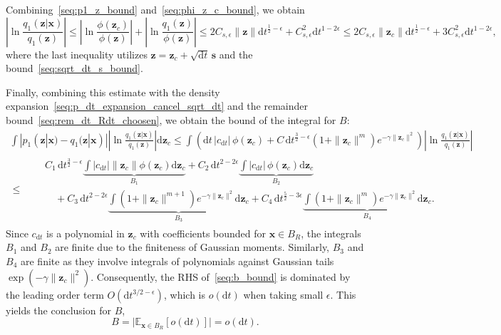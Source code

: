\documentclass[
 longbibliography,
 twocolumn,
 superscriptaddress,
 amsmath,
 amssymb,
 amsthm,
 amsfonts,
 prl,
 floatfix,
]{revtex4-2}
\begin{document}
\begin{widetext}
Combining~\eqref{seq:p1_z_bound} and~\eqref{seq:phi_z_c_bound}, we obtain
\begin{equation}
    \left|\ln\frac{q_1(\bm z|\bm x)}{q_1(\bm z)}\right|
    \leq
    \left|\ln\frac{\phi(\bm z_c)}{\phi(\bm z)}\right|
    +\left|\ln\frac{q_1(\bm z)}{\phi(\bm z)}\right|
    \leq
    2C_{s,\epsilon}\|\bm z\|\mathrm dt^{\frac{1}{2}-\epsilon}
    +C_{s,\epsilon}^2\mathrm dt^{1-2\epsilon}
    \leq2C_{s,\epsilon}\|\bm z_c\|\mathrm dt^{\frac{1}{2}-\epsilon}
    +3C_{s,\epsilon}^2\mathrm dt^{1-2\epsilon},
    \label{seq:ln_q1x_q1_bound}
\end{equation}
where the last inequality utilizes $\bm z = \bm z_c + \sqrt{\mathrm dt}\,\bm s$ and the bound~\eqref{seq:sqrt_dt_s_bound}. 

Finally, combining this estimate with the density expansion~\eqref{seq:p_dt_expansion_cancel_sqrt_dt} and the remainder bound~\eqref{seq:rem_dt_Rdt_choosen}, we obtain the bound of the integral for $B$:
\begin{equation}
    \begin{aligned}
    \int|p_1(\bm z|\bm x)-q_1(\bm z|\bm x)|
    \left|\ln\frac{q_1(\bm z|\bm x)}{q_1(\bm z)}\right|
    \mathrm d\bm z_c
    \leq
    \int\left(\mathrm dt\,|c_{\mathrm dt}|\,\phi(\bm z_c)
    +C\,\mathrm dt^{\frac{3}{2}-\epsilon}(1+\|\bm z_c\|^m)e^{-\gamma\|\bm z_c\|^2}\right)
    \left|\ln\frac{q_1(\bm z|\bm x)}{q_1(\bm z)}\right|
    \\
    \leq
    \begin{aligned}
        &\quad C_1\,\mathrm dt^{\frac{3}{2}-\epsilon}
        \underbrace{
        \int |c_{\mathrm dt}|\|\bm z_c\|\phi(\bm z_c)\mathrm d\bm z_c}_{B_1}
        +
        C_2\,\mathrm dt^{2-2\epsilon}
        \underbrace{
        \int |c_{\mathrm dt}|\,\phi(\bm z_c)\mathrm d\bm z_c}_{B_2}
        \\
        &\qquad 
        +C_3\,\mathrm dt^{2-2\epsilon}\underbrace{
        \int(1+\|\bm z_c\|^{m+1})e^{-\gamma\|\bm z_c\|^2}\mathrm d\bm z_c}_{B_3}
        +C_4\,\mathrm dt^{\frac{5}{2}-3\epsilon}
        \underbrace{\int(1+\|\bm z_c\|^m)e^{-\gamma\|\bm z_c\|^2}\mathrm d\bm z_c}_{B_4}.
    \end{aligned}
    \end{aligned}
    \label{seq:b_bound}
\end{equation}
Since $c_{\mathrm dt}$ is a polynomial in $\bm z_c$ with coefficients bounded for $\bm x\in B_R$, the integrals $B_1$ and $B_2$ are finite due to the finiteness of Gaussian moments. Similarly, $B_3$ and $B_4$ are finite as they involve integrals of polynomials against Gaussian tails $\exp(-\gamma\|\bm z_c\|^2)$. Consequently, the RHS of~\eqref{seq:b_bound} is dominated by the leading order term $O(\mathrm dt^{3/2-\epsilon})$, which is $o(\mathrm dt)$ when taking small $\epsilon$. This yields the conclusion for $B$,
\begin{equation}
    B=\big|\mathbb E_{\bm x\in B_R}[o(\mathrm dt)]\big|=o(\mathrm dt).
    \label{seq:B_odt}
\end{equation}


\end{widetext}
\end{document}
